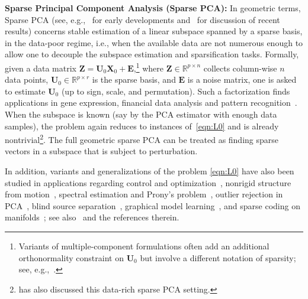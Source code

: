 \documentclass[11pt, journal, final]{IEEEtran}
\numberwithin{equation}{section}
\newcommand{\R}{\mathbb{R}}
\newcommand{\mb}{\mathbf}
\begin{document}
{\par\smallskip
\noindent\textbf{Sparse Principal Component Analysis (Sparse PCA):} In geometric terms, Sparse PCA (see, e.g.,~\cite{zou2006sparse,johnstone2009consistency,d2007direct} for early developments and~\cite{krauthgamer2015semidefinite, ma2015sum} for discussion of recent results) concerns stable estimation of a linear subspace spanned by a sparse basis, in the data-poor regime, i.e., when the available data are not numerous enough to allow one to decouple the subspace estimation and sparsification tasks. Formally, given a data matrix $\mb Z = \mb U_0 \mb X_0 + \mb E$,\footnote{Variants of multiple-component formulations often add an additional orthonormality constraint on $\mb U_0$ but involve a different notation of sparsity; see, e.g.,~\cite{zou2006sparse, vu2013fantope, lei2015sparsistency, wang2014nonconvex}. } where $\mb Z \in \R^{p \times n}$ collects column-wise $n$ data points, $\mb U_0 \in \R^{p \times r}$ is the sparse basis, and $\mb E$ is a noise matrix, one is asked to estimate $\mb U_0$ (up to sign, scale, and permutation). Such a factorization finds applications in gene expression, financial data analysis and pattern recognition~\cite{Aspremont07sparse}. When the subspace is known (say by the PCA estimator with enough data samples), the problem again reduces to instances of~\eqref{eqn:L0} and is already nontrivial\footnote{\cite{hand2013recovering} has also discussed this data-rich sparse PCA setting. }. The full geometric sparse PCA can be treated as finding sparse vectors in a subspace that is subject to perturbation.
\par\smallskip

In addition, variants and generalizations of the problem \eqref{eqn:L0} have also been studied in applications regarding control and optimization~\cite{zhao2013rank}, nonrigid structure from motion~\cite{dai2012simple}, spectral estimation and Prony's problem~\cite{beylkin2005approximation}, outlier rejection in PCA~\cite{manolis2015dualPCA}, blind source separation~\cite{zibulevsky2001blind}, graphical model learning~\cite{anandkumar2013overcomplete}, and sparse coding on manifolds~\cite{ho2013nonlinear}; see also~\cite{nakatsukasa15finding} and the references therein.

}
\end{document}

